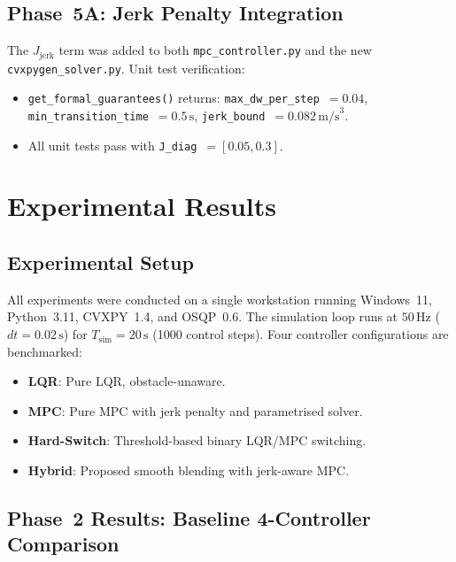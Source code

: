 \documentclass[12pt,a4paper,oneside]{report}
\begin{document}
\section{Phase~5A: Jerk Penalty Integration}

The \(J_{\mathrm{jerk}}\) term was added to both \texttt{mpc\_controller.py}
and the new \texttt{cvxpygen\_solver.py}. Unit test verification:
\begin{itemize}
  \item \texttt{get\_formal\_guarantees()} returns:
    \texttt{max\_dw\_per\_step}~$=0.04$,
    \texttt{min\_transition\_time}~$=0.5\,\text{s}$,
    \texttt{jerk\_bound}~$=0.082\,\text{m/s}^3$.
  \item All unit tests pass with \texttt{J\_diag}~$=[0.05,0.3]$.
\end{itemize}

\chapter{Experimental Results}\label{ch:results}

\section{Experimental Setup}

All experiments were conducted on a single workstation running Windows~11,
Python~3.11, CVXPY~1.4, and OSQP~0.6. The simulation loop runs at
\(50\,\text{Hz}\) (\(dt=0.02\,\text{s}\)) for \(T_{\mathrm{sim}}=20\,\text{s}\)
(1000 control steps). Four controller configurations are benchmarked:
\begin{itemize}
  \item \textbf{LQR}: Pure LQR, obstacle-unaware.
  \item \textbf{MPC}: Pure MPC with jerk penalty and parametrised solver.
  \item \textbf{Hard-Switch}: Threshold-based binary LQR/MPC switching.
  \item \textbf{Hybrid}: Proposed smooth blending with jerk-aware MPC.
\end{itemize}

\section{Phase~2 Results: Baseline 4-Controller Comparison}
\end{document}
